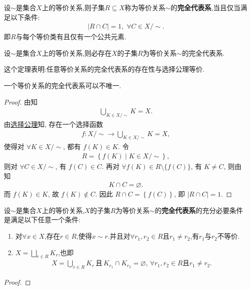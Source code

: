 \documentclass[../../main.tex]{subfiles}%
\begin{document}
\begin{definition}[完全代表系]\label{definition:等价类的完全代表系}
设$\sim$是集合$X$上的等价关系,则子集$R\subseteq X$称为等价关系$\sim$的\textbf{完全代表系},当且仅当满足以下条件:
\begin{align*}
|R\cap C|=1,\,\,\forall C\in X/\sim .
\end{align*}
即$R$与每个等价类有且仅有一个公共元素.
\end{definition}

\begin{theorem}\label{theorem:等价关系的完全代表系的存在性}
设$\sim $是集合$X$上的等价关系,则必存在$X$的子集$R$为等价关系$\sim$的完全代表系.
\end{theorem}
\begin{remark}
这个定理表明:任意等价关系的完全代表系的存在性与选择公理等价.

一个等价关系的完全代表系可以不唯一.
\end{remark}
\begin{proof}
由知
\begin{align*}
\bigcup_{K\in X/\sim} K = X.
\end{align*}
由\hyperref[axiom:选择公理]{选择公理}知, 存在一个选择函数
\begin{align*}
f: X/\sim \to \bigcup_{K\in X/\sim} K = X,
\end{align*}
使得对 $\forall K\in X/\sim$, 都有 $f(K) \in K$. 令
\begin{align*}
R = \left\{ f(K) \mid K\in X/\sim \right\},
\end{align*}
则对 $\forall C\in X/\sim$, 有 $f(C) \in C$. 再对 $\forall f(K) \in R\setminus \{f(C)\}$, 有 $K\neq C$, 则由知
\begin{align*}
K\cap C = \varnothing.
\end{align*}
而 $f(K) \in K$, 故 $f(K) \notin C$. 因此 $R\cap C = \left\{ f(C) \right\}$, 即 $|R\cap C| = 1$.
\end{proof}

\begin{theorem}
设$\sim$是集合$X$上的等价关系,$X$的子集$R$为等价关系$\sim$的\textbf{完全代表系}的充分必要条件是满足以下任意一个条件:
\begin{enumerate}[(1)]
\item 对$\forall x\in X$,存在$r\in R$,使得$x\sim r$.并且对$\forall r_1,r_2\in R$且$r_1\neq r_2$,有$r_1$与$r_2$不等价.

\item $X=\bigsqcup_{r\in R}K_r$,也即
\begin{align*}
X=\bigcup_{r\in R}{K_r}\,\text{且}\,K_{r_1}\cap K_{r_2}=\varnothing ,\,\forall r_1,r_2\in R\text{且}r_1\ne r_2.
\end{align*}

\end{enumerate}
\end{theorem}
\begin{proof}

\end{proof}
\end{document}
